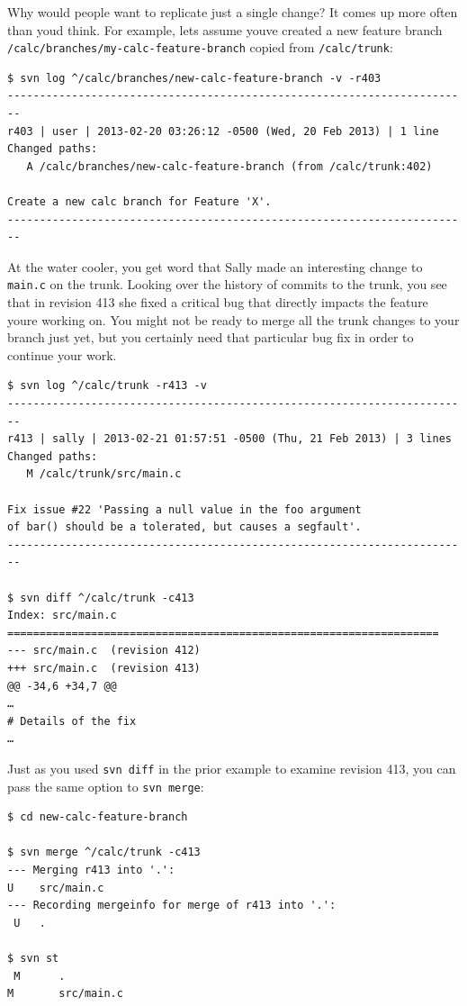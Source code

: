 Why would people want to replicate just a single change? It comes up
more often than you\textquotesingle d think. For example,
let\textquotesingle s assume you\textquotesingle ve created a new
feature branch \texttt{/calc/branches/my-calc-feature-branch} copied
from \texttt{/calc/trunk}:

\begin{verbatim}
$ svn log ^/calc/branches/new-calc-feature-branch -v -r403
------------------------------------------------------------------------
r403 | user | 2013-02-20 03:26:12 -0500 (Wed, 20 Feb 2013) | 1 line
Changed paths:
   A /calc/branches/new-calc-feature-branch (from /calc/trunk:402)

Create a new calc branch for Feature 'X'.
------------------------------------------------------------------------
\end{verbatim}

At the water cooler, you get word that Sally made an interesting change
to \texttt{main.c} on the trunk. Looking over the history of commits to
the trunk, you see that in revision 413 she fixed a critical bug that
directly impacts the feature you\textquotesingle re working on. You
might not be ready to merge all the trunk changes to your branch just
yet, but you certainly need that particular bug fix in order to continue
your work.

\begin{verbatim}
$ svn log ^/calc/trunk -r413 -v
------------------------------------------------------------------------
r413 | sally | 2013-02-21 01:57:51 -0500 (Thu, 21 Feb 2013) | 3 lines
Changed paths:
   M /calc/trunk/src/main.c

Fix issue #22 'Passing a null value in the foo argument
of bar() should be a tolerated, but causes a segfault'.
------------------------------------------------------------------------

$ svn diff ^/calc/trunk -c413
Index: src/main.c
===================================================================
--- src/main.c  (revision 412)
+++ src/main.c  (revision 413)
@@ -34,6 +34,7 @@
…
# Details of the fix
…
\end{verbatim}

Just as you used \texttt{svn\ diff} in the prior example to examine
revision 413, you can pass the same option to \texttt{svn\ merge}:

\begin{verbatim}
$ cd new-calc-feature-branch

$ svn merge ^/calc/trunk -c413
--- Merging r413 into '.':
U    src/main.c
--- Recording mergeinfo for merge of r413 into '.':
 U   .

$ svn st
 M      .
M       src/main.c
\end{verbatim}

